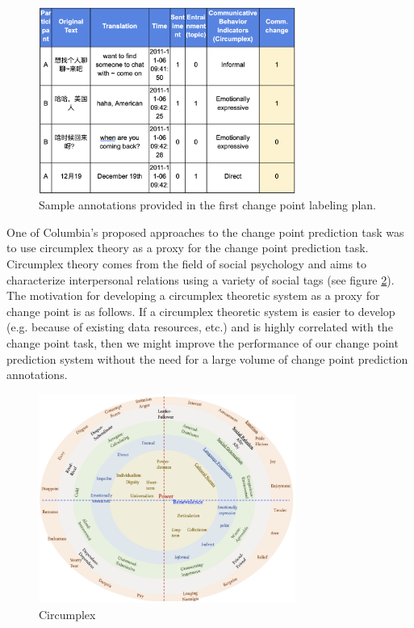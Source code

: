 \documentclass[12pt]{article}
\begin{document}
\begin{figure}[H]
    \centering
    \includegraphics[width=0.75\textwidth]{sample_annotations.png}
    \caption{Sample annotations provided in the first change point labeling plan.}
    \label{fig:sample_annotations}
\end{figure}

One of Columbia's proposed approaches to the change point prediction task was to use circumplex theory as a proxy for the change point prediction task. Circumplex theory comes from the field of social psychology and aims to characterize interpersonal relations using a variety of social tags (see figure \ref{fig:circumplex}). The motivation for developing a circumplex theoretic system as a proxy for change point is as follows. If a circumplex theoretic system is easier to develop (e.g. because of existing data resources, etc.) and is highly correlated with the change point task, then we might improve the performance of our change point prediction system without the need for a large volume of change point prediction annotations.

\begin{figure}[H]
    \centering
    \includegraphics[width=0.75\textwidth]{circumplex.png}
    \caption{Circumplex}
    \label{fig:circumplex}
\end{figure}
\end{document}
